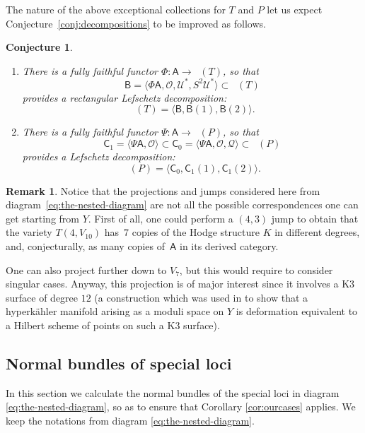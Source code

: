 \documentclass[11pt]{article}
\newcommand{\skpt}{\smallskip}
\let\mathcal\mathscr
\theoremstyle{plain}
\newtheorem{conjecture}[theorem]{Conjecture}
\theoremstyle{definition}
\newtheorem{remark}[theorem]{Remark}
\newcommand{\cat}[1]{\mathsf{#1}}
\newcommand{\sod}[1]{\langle #1 \rangle}
\DeclareMathOperator{\Db}{{\cat{D}^{\mathrm{b}}}}
\newcommand{\sheaf}[1]{\mathcal{#1}}
\newcommand{\ko}{\sheaf{O}}\let\OO\ko\let\cO\ko
\newcommand{\kq}{\sheaf{Q}}
\newcommand{\ku}{\sheaf{U}}
\renewcommand{\theenumi}{\alph{enumi}}
\begin{document}
The nature of the above exceptional collections for $T$ and $P$ let us expect Conjecture~\ref{conj:decompositions}
to be improved as follows.

\skpt
\begin{conjecture}\label{conj:deco-improved}
\begin{enumerate}\renewcommand{\theenumi}{\Alph{enumi}}
\setcounter{enumi}{19}\item\label{enum:T}
There is a fully faithful functor $\Phi: \cat{A} \to \Db(T)$, so that\vspace*{-3pt}
\[
\cat{B}=\sod{\Phi \cat{A},\ko,\ku^*,S^2\ku^*} \subset \Db(T)
\]
provides a rectangular Lefschetz decomposition:\vspace*{-3pt}
\[
\Db(T)=\sod{\cat{B},\cat{B}(1),\cat{B}(2)}.
\]

\setcounter{enumi}{15}\item\label{enum:P}
There is a fully faithful functor $\Psi: \cat{A} \to \Db(P)$, so that\vspace*{-3pt}
\[
\cat{C}_1=\sod{\Psi \cat{A}, \ko} \subset \cat{C}_0 = \sod{\Psi\cat{A},\cO, \kq} \subset \Db(P)
\]
provides a Lefschetz decomposition:\vspace*{-3pt}
\[
\Db(P) = \sod{\cat{C}_0,\cat{C}_1(1),\cat{C}_1(2)}.
\]
\end{enumerate}
\end{conjecture}

\begin{remark}
Notice that the projections and jumps considered here from diagram~\eqref{eq:the-nested-diagram}
are not all the possible correspondences one can get starting from $Y$. First of all, one
could perform a $(4,3)$ jump to obtain that the variety $T(4,V_{10})$ has~$7$ copies
of the Hodge structure $K$ in different degrees, and, conjecturally, as many
copies of~$\cat{A}$ in its derived category.

One can also project further down to $V_7$, but this would require to consider singular cases.
Anyway, this projection is of major interest since it involves a K3 surface of degree $12$
(a construction which was used in \cite{debarre-voisin} to show that a hyperkähler manifold
arising as a moduli space on $Y$
is deformation equivalent to a Hilbert scheme of points on such a K3 surface).
\end{remark}

\subsection{Normal bundles of special loci}
In this section we calculate the normal bundles of the special loci in diagram
\eqref{eq:the-nested-diagram}, so as to ensure that Corollary \ref{cor:ourcases} applies.
We keep the notations from diagram \eqref{eq:the-nested-diagram}.
\end{document}
